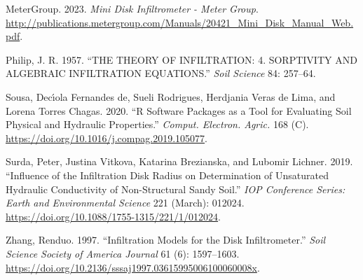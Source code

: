 \documentclass[
]{article}
\newlength{\cslhangindent}
\newlength{\cslentryspacingunit} %
\newenvironment{CSLReferences}[2] %
 {%
  \setlength{\parindent}{0pt}
  \ifodd #1
  \let\oldpar\par
  \def\par{\hangindent=\cslhangindent\oldpar}
  \fi
  \setlength{\parskip}{#2\cslentryspacingunit}
 }%
 {}
\begin{document}
\begin{CSLReferences}{1}{0}
\leavevmode{}%
MeterGroup. 2023. \emph{Mini Disk Infiltrometer - Meter Group}.
\url{http://publications.metergroup.com/Manuals/20421_Mini_Disk_Manual_Web.pdf}.

\leavevmode{}%
Philip, J. R. 1957. {``THE THEORY OF INFILTRATION: 4. SORPTIVITY AND
ALGEBRAIC INFILTRATION EQUATIONS.''} \emph{Soil Science} 84: 257--64.

\leavevmode{}%
Sousa, Decı́ola Fernandes de, Sueli Rodrigues, Herdjania Veras de Lima,
and Lorena Torres Chagas. 2020. {``R Software Packages as a Tool for
Evaluating Soil Physical and Hydraulic Properties.''} \emph{Comput.
Electron. Agric.} 168 (C).
\url{https://doi.org/10.1016/j.compag.2019.105077}.

\leavevmode{}%
Surda, Peter, Justina Vitkova, Katarina Brezianska, and Lubomir Lichner.
2019. {``Influence of the Infiltration Disk Radius on Determination of
Unsaturated Hydraulic Conductivity of Non-Structural Sandy Soil.''}
\emph{{IOP} Conference Series: Earth and Environmental Science} 221
(March): 012024. \url{https://doi.org/10.1088/1755-1315/221/1/012024}.

\leavevmode{}%
Zhang, Renduo. 1997. {``Infiltration Models for the Disk
Infiltrometer.''} \emph{Soil Science Society of America Journal} 61 (6):
1597--1603.
\url{https://doi.org/10.2136/sssaj1997.03615995006100060008x}.

\end{CSLReferences}
\end{document}
